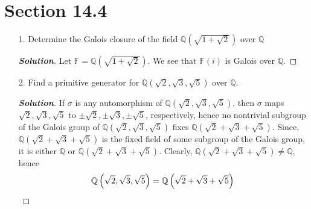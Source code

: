 \documentclass[12pt,leqno]{article}
\theoremstyle{definition}
\newcommand{\Q}{\mathbb{Q}}
\newcommand{\F}{\mathbb{F}}
\newcommand{\+}{\oplus}
\newenvironment{Solution}{\begin{proof}[\textnormal{\textbf{Solution}}]}{\end{proof}}
\begin{document}
\section*{Section 14.4}
  \begin{enumerate}
   \item [1.] Determine the Galois closure of the field $\Q\left(\sqrt{1+\sqrt{2}}\right)$ over $\Q$
    \begin{Solution}
     Let $\F=\Q\left(\sqrt{1+\sqrt{2}}\right)$. We see that $\F(i)$ is Galois over $\Q$.
    \end{Solution}
   \item [2.] Find a primitive generator for $\Q\left(\sqrt{2},\sqrt{3},\sqrt{5}\right)$ over $\Q$.
    \begin{Solution}
     If $\sigma$ is any automorphism of $\Q\left(\sqrt{2},\sqrt{3},\sqrt{5}\right)$, then $\sigma$ maps $\sqrt{2},\sqrt{3},\sqrt{5}$ to $\pm\sqrt{2},\pm\sqrt{3},\pm\sqrt{5}$, respectively, hence no nontrivial subgroup of the Galois group of $\Q\left(\sqrt{2},\sqrt{3},\sqrt{5}\right)$ fixes $\Q\left(\sqrt{2}+\sqrt{3}+\sqrt{5}\right)$. Since, $\Q\left(\sqrt{2}+\sqrt{3}+\sqrt{5}\right)$ is the fixed field of some subgroup of the Galois group, it is either $\Q$ or $\Q\left(\sqrt{2}+\sqrt{3}+\sqrt{5}\right)$. Clearly, $\Q\left(\sqrt{2}+\sqrt{3}+\sqrt{5}\right)\not=\Q$, hence \[\Q\left(\sqrt{2},\sqrt{3},\sqrt{5}\right)=\Q\left(\sqrt{2}+\sqrt{3}+\sqrt{5}\right)\qedhere\]
    \end{Solution}
  \end{enumerate}
\end{document}
